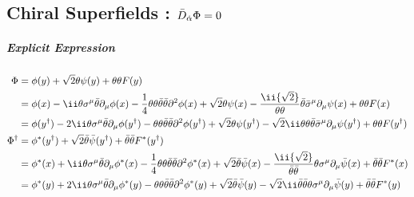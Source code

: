 \subsection{Chiral Superfields : $\bar D_{\dot\alpha} \Phi = 0$}
\subparagraph{Explicit Expression}
\begin{align}
\Phi
={}& \phi(y) + \sqrt2\theta\psi(y)+\thth F(y)\\
={}& \phi(x) - \ii\theta\Sm\btheta\Pm\phi(x)
               - \frac14\thth\bthth\Psq\phi(x)
     + \sqrt2\theta\psi(x) - \frac\ii{\sqrt2}\thth\btheta\bSm\Pm\psi(x)
     + \thth F(x)\\
={}& \phi(y^\dagger) - 2\ii\theta\Sm\btheta\Pm\phi(y^\dagger)
               - \thth\bthth\Psq\phi(y^\dagger)
     + \sqrt2\theta\psi(y^\dagger) - \sqrt2\ii\thth\btheta\bSm\Pm\psi(y^\dagger)
     + \thth F(y^\dagger)\\
\Phi^\dagger
={}& \phi^*(y^\dagger) + \sqrt2\btheta\bar\psi(y^\dagger)+\bthth F^*(y^\dagger)\\
={}& \phi^*(x) + \ii\theta\Sm\btheta\Pm\phi^*(x)
               - \frac14\thth\bthth\Psq\phi^*(x)
   + \sqrt2\btheta\bar\psi(x) - \frac\ii{\sqrt2}\bthth\theta\Sm\Pm\bar\psi(x)
   + \bthth F^*(x)\\
={}& \phi^*(y) + 2\ii\theta\Sm\btheta\Pm\phi^*(y)
               - \thth\bthth\Psq\phi^*(y)
   + \sqrt2\btheta\bar\psi(y) - \sqrt2\ii\bthth\theta\Sm\Pm\bar\psi(y)
   + \bthth F^*(y)
\end{align}

